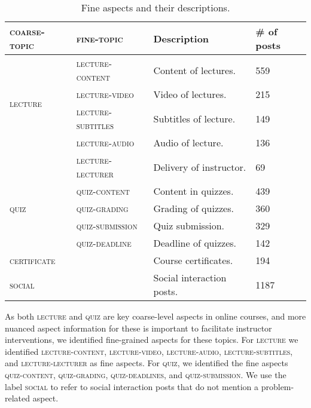 \begin{table} [t]
\centering
\tiny{
\begin{tabular}{p{2.0cm}p{2.0cm}p{2.0cm}p{1.2cm}}
\toprule
\multicolumn{1}{l}{\textsc{coarse-topic}} & \multicolumn{1}{l}{\textsc{fine-topic}} & Description & \# of posts  \\
\toprule

\multicolumn{1}{l}{\multirow{4}{*}{\textsc{lecture}}} &
\multicolumn{1}{l}{\textsc{lecture-content}} & Content of lectures. & 559    \\
\multicolumn{1}{c}{} &
\multicolumn{1}{l}{\textsc{lecture-video}} & Video of lectures. & 215   \\
\multicolumn{1}{c}{} &
\multicolumn{1}{l}{\textsc{lecture-subtitles}} & Subtitles of lecture. &  149    \\
\multicolumn{1}{c}{} &
\multicolumn{1}{l}{{\textsc{lecture-audio}}}  & Audio of lecture. & 136  \\ 
\multicolumn{1}{c}{} &
\multicolumn{1}{l}{\textsc{lecture-lecturer}}  & Delivery of instructor.  & 69    \\

 \midrule


\multicolumn{1}{l}{\multirow{3}{*}{\textsc{quiz}}} &
\multicolumn{1}{l}{\textsc{quiz-content}}  & Content in quizzes. & 439  \\
 \multicolumn{1}{c}{} &
\multicolumn{1}{l}{\textsc{quiz-grading}} & Grading of quizzes. & 360  \\ 
\multicolumn{1}{c}{} &
\multicolumn{1}{l}{\textsc{quiz-submission}}  & Quiz submission. & 329  \\
\multicolumn{1}{c}{} &
\multicolumn{1}{l}{\textsc{quiz-deadline}}  & Deadline of quizzes. & 142  \\

 \midrule
\multicolumn{1}{l}{\multirow{1}{*}{\textsc{certificate}}} & 
\multicolumn{1}{l}{\textsc{}} & Course certificates. & 194   \\ 
 \midrule
\multicolumn{1}{l}{\multirow{1}{*}{\textsc{social}}} &
\multicolumn{1}{l}{\textsc{}} & Social interaction posts. & 1187   \\ 
\bottomrule
\end{tabular}
}
\caption{Fine aspects and their descriptions.}
\label{table:moocaspects}
\end{table}
\mbox{}


As both \textsc{lecture} and \textsc{quiz} are key coarse-level aspects in online courses, and more nuanced aspect information for these is important to facilitate instructor interventions, we identified fine-grained aspects for these topics. For \textsc{lecture} we identified \textsc{lecture-content}, \textsc{lecture-video}, \textsc{lecture-audio}, \textsc{lecture-subtitles}, and \textsc{lecture-lecturer} as fine aspects. For \textsc{quiz}, we identified the fine aspects \textsc{quiz-content}, \textsc{quiz-grading}, \textsc{quiz-deadlines}, and \textsc{quiz-submission}. We use the label \textsc{social} to refer to social interaction posts that do not mention a problem-related aspect.  
  

